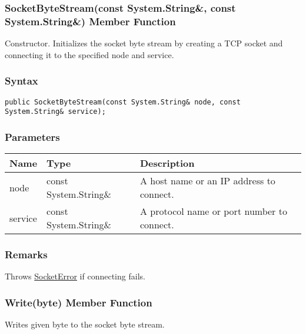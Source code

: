 \documentclass[a4paper,oneside,11.000000pt]{book}
\begin{document}
\hypertarget{System.Net.Sockets.SocketByteStream.constructor.P.System.Net.Sockets.SocketByteStream.C.R.System.String.C.R.System.String}{\subsubsection*{SocketByteStream(const System.String\&, const System.String\&) Member Function}}
\begin{flushleft}
Constructor. Initializes the socket byte stream by creating a TCP socket and connecting it to the specified node and service.

\end{flushleft}
\subsubsection*{Syntax}
\texttt{public SocketByteStream(const System.String\& node, const System.String\& service);}
\subsubsection*{Parameters}
\begin{flushleft}
\begin{supertabular}[l]{!{\raggedright}p{1.56801cm}!{\raggedright}p{4.63128cm}!{\raggedright}p{5.23538cm}}
\textbf{Name}
& \textbf{Type}
& \textbf{Description}
\\
\hline
node
& const System.\-String\&\-
& A host name or an IP address to connect.

\\
service
& const System.\-String\&\-
& A protocol name or port number to connect.

\\
\end{supertabular}

\end{flushleft}
\subsubsection*{Remarks}
\begin{flushleft}
Throws \hyperlink{System.Net.Sockets.SocketError}{SocketError} if connecting fails.

\end{flushleft}
\clearpage

\hypertarget{System.Net.Sockets.SocketByteStream.Write.P.System.Net.Sockets.SocketByteStream.byte}{\subsubsection*{Write(byte) Member Function}}\begin{flushleft}
Writes given byte to the socket byte stream.

\end{flushleft}
\end{document}
